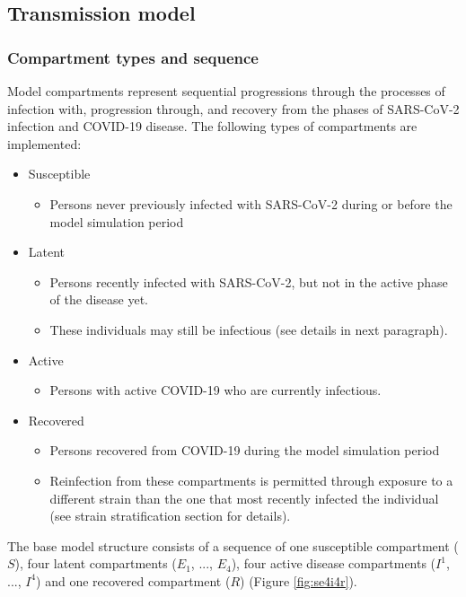 
\subsection{Transmission model}
\label{trans} 
\subsubsection{Compartment types and sequence}
Model compartments represent sequential progressions through the processes of 
infection with, progression through, and recovery from the phases of SARS-CoV-2
infection and COVID-19 disease. The following types of compartments are implemented:
\begin{itemize}
    \item Susceptible
    \begin{itemize}
        \item Persons never previously infected with SARS-CoV-2 during or before the model simulation period
    \end{itemize}
    \item Latent
    \begin{itemize}
        \item Persons recently infected with SARS-CoV-2, but not in the active phase of the disease yet.
        \item These individuals may still be infectious (see details in next paragraph).
    \end{itemize}
    \item Active
    \begin{itemize}
        \item Persons with active COVID-19 who are currently infectious.
    \end{itemize}
    \item Recovered
    \begin{itemize}
        \item Persons recovered from COVID-19 during the model simulation period       
        \item Reinfection from these compartments is permitted through exposure to a different
        strain than the one that most recently infected the individual (see strain stratification section for details).
    \end{itemize}
\end{itemize}
The base model structure consists of a sequence of one susceptible compartment ($S$), four latent compartments ($E_1$, ..., $E_4$), four active disease compartments ($I^1$, ..., $I^4$) and one recovered compartment ($R$) (Figure \ref{fig:se4i4r}).

